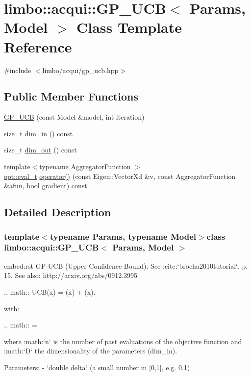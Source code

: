 \hypertarget{classlimbo_1_1acqui_1_1_g_p___u_c_b}{}\section{limbo\+:\+:acqui\+:\+:G\+P\+\_\+\+U\+C\+B$<$ Params, Model $>$ Class Template Reference}
\label{classlimbo_1_1acqui_1_1_g_p___u_c_b}


{\ttfamily \#include $<$limbo/acqui/gp\+\_\+ucb.\+hpp$>$}

\subsection*{Public Member Functions}
\begin{DoxyCompactItemize}
\item 
\hyperlink{classlimbo_1_1acqui_1_1_g_p___u_c_b_a9846faaa39b1d1d7b039284f2c905205}{G\+P\+\_\+\+U\+C\+B} (const Model \&model, int iteration)
\item 
size\+\_\+t \hyperlink{classlimbo_1_1acqui_1_1_g_p___u_c_b_a30c58b2f857da76de61e8cf555e73d06}{dim\+\_\+in} () const 
\item 
size\+\_\+t \hyperlink{classlimbo_1_1acqui_1_1_g_p___u_c_b_abde3ddcfa0bfb16d453587832f4e78b1}{dim\+\_\+out} () const 
\item 
{\footnotesize template$<$typename Aggregator\+Function $>$ }\\\hyperlink{group__opt__tools_ga362b55973a38ac71f27a06f9d9c14f24}{opt\+::eval\+\_\+t} \hyperlink{classlimbo_1_1acqui_1_1_g_p___u_c_b_a81dbe2aae8aea9d463547ac4d9236741}{operator()} (const Eigen\+::\+Vector\+Xd \&v, const Aggregator\+Function \&afun, bool gradient) const 
\end{DoxyCompactItemize}


\subsection{Detailed Description}
\subsubsection*{template$<$typename Params, typename Model$>$class limbo\+::acqui\+::\+G\+P\+\_\+\+U\+C\+B$<$ Params, Model $>$}

\begin{DoxyVerb}embed:rst
GP-UCB (Upper Confidence Bound). See :cite:`brochu2010tutorial`, p. 15. See also: http://arxiv.org/abs/0912.3995

.. math::
  UCB(x) = \mu(x) + \kappa \sigma(x).

with:

.. math::
  \kappa = 

where :math:`n` is the number of past evaluations of the objective function and :math:`D` the dimensionality of the parameters (dim_in).

Parameters:
  - `double delta` (a small number in [0,1], e.g. 0.1)
\end{DoxyVerb}
 

